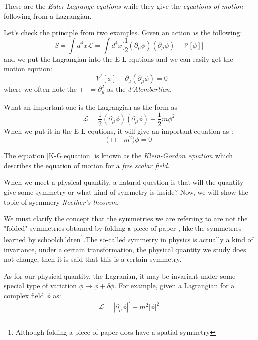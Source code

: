 \documentclass[12pt,openany]{book}
\begin{document}
	These are the \textit{Euler-Lagrange equtions} while they give the \textit{equations of motion} following from a Lagrangian.\par 
	Let's check the principle from two examples. Given an action as the following:
	\begin{equation*}
		S=\int d^4x\mathcal{L}=\int d^4x\big[\frac{1}{2}(\partial_\mu\phi)(\partial_\mu\phi)-\mathcal{V}[\phi]\big]
	\end{equation*}
	and we put the Lagrangian into the E-L equtions and we can easily get the motion eqution:
	\begin{equation*}
		-\mathcal{V}^\prime[\phi]-\partial_\mu(\partial_\mu\phi)=0
	\end{equation*}
	where we often note the $\Box=\partial^2_\mu$ as the \textit{d'Alembertian}.\par 
	What an important one is the Lagrangian as the form as 
	\begin{equation}
		\mathcal{L}=\frac{1}{2}(\partial_\mu\phi)(\partial_\mu\phi)-\frac{1}{2}m\phi^2
	\end{equation}
	When we put it in the E-L equtions, it will give an important equation as :
	\begin{equation}\label{K-G equation}
		\boxed{\big(\Box+m^2\big)\phi=0}
	\end{equation}\par 
	The equation \eqref{K-G equation} is known as the \textit{Klein-Gordon equation} which describes the equation of motion 
	for a \textit{free scalar field}.\par 
	When we meet a physical quantity, a natural question is that will the quantity give some symmetry or what kind of symmetry is 
	inside? Now, we will show the topic of syemmery \textit{Noether's theorem}. \par 
	We must clarify the concept that the symmetries we are referring to are not the "folded" symmetries obtained by folding a piece of paper
	, like the symmetries learned by schoolchildren\footnote{Although folding a piece of paper does have a spatial symmetry}.The so-called symmetry in physics is actually a kind of invariance, 
	under a certain transformation, the physical quantity we study does not change, then it is said that this is a certain symmetry. \par 
	As for our physical quantity, the Lagranian, it may be invariant under some special type of variation $\phi\rightarrow\phi+\delta\phi$. For example,
	given a Lagrangian for a complex field $\phi$ as:
	\begin{equation}
		\mathcal{L}=|\partial_\mu\phi|^2-m^2|\phi|^2
	\end{equation}
\end{document}
